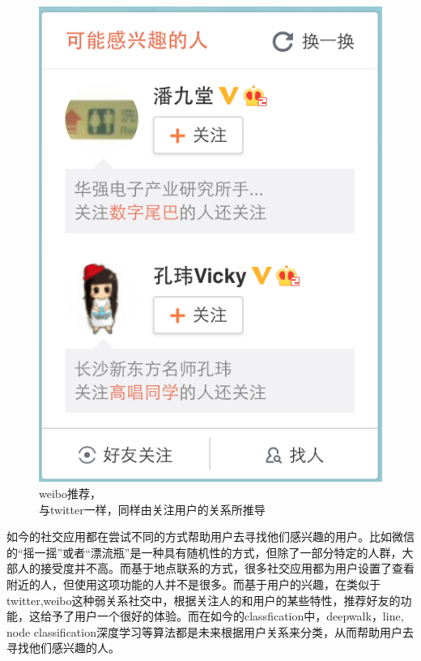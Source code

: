 \begin{figure}[h]
\begin{minipage}[t]{0.45\linewidth}
\includegraphics[width=\textwidth]{img/chap1/weibo_recommend.png}
\caption{weibo推荐，\\与twitter一样，同样由关注用户的关系所推导\label{weibo推荐，}}
\end{minipage}

\end{figure}

如今的社交应用都在尝试不同的方式帮助用户去寻找他们感兴趣的用户。比如微信的“摇一摇”或者“漂流瓶”是一种具有随机性的方式，但除了一部分特定的人群，大部人的接受度并不高。而基于地点联系的方式，很多社交应用都为用户设置了查看附近的人，但使用这项功能的人并不是很多。而基于用户的兴趣，在类似于twitter,weibo这种弱关系社交中，根据关注人的和用户的某些特性，推荐好友的功能，这给予了用户一个很好的体验。而在如今的classfication中，deepwalk\parencite{deepwalk}，line\parencite{node1}, node classification\parencite{node}深度学习\parencite{deep}等算法都是未来根据用户关系来分类，从而帮助用户去寻找他们感兴趣的人。


